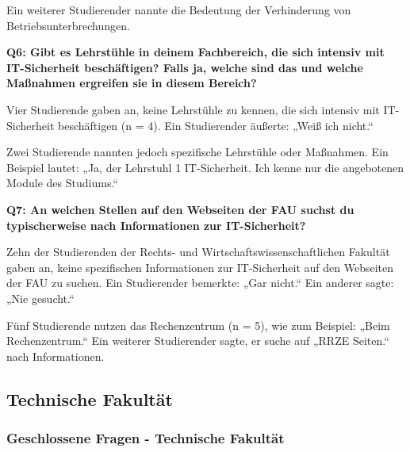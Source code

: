 \documentclass[german,report]{i1thesis}
\begin{document}
Ein weiterer Studierender nannte die Bedeutung der Verhinderung von Betriebsunterbrechungen.

\textbf{Q6: Gibt es Lehrstühle in deinem Fachbereich, die sich intensiv mit IT-Sicherheit beschäftigen? Falls ja, welche sind das und welche Maßnahmen ergreifen sie in diesem Bereich?}

Vier Studierende gaben an, keine Lehrstühle zu kennen, die sich intensiv mit IT-Sicherheit beschäftigen (n = 4). Ein Studierender äußerte: „Weiß ich nicht.“

Zwei Studierende nannten jedoch spezifische Lehrstühle oder Maßnahmen. Ein Beispiel lautet: „Ja, der Lehrstuhl 1 IT-Sicherheit. Ich kenne nur die angebotenen Module des Studiums.“

\textbf{Q7: An welchen Stellen auf den Webseiten der FAU suchst du typischerweise nach Informationen zur IT-Sicherheit?}

Zehn der Studierenden der Rechts- und Wirtschaftswissenschaftlichen Fakultät gaben an, keine spezifischen Informationen zur IT-Sicherheit auf den Webseiten der FAU zu suchen. Ein Studierender bemerkte: „Gar nicht.“ Ein anderer sagte: „Nie gesucht.“

Fünf Studierende nutzen das Rechenzentrum (n = 5), wie zum Beispiel: „Beim Rechenzentrum.“ Ein weiterer Studierender sagte, er suche auf „RRZE Seiten.“ nach Informationen.

\subsection{Technische Fakultät}

\subsubsection{Geschlossene Fragen - Technische Fakultät}
\end{document}
